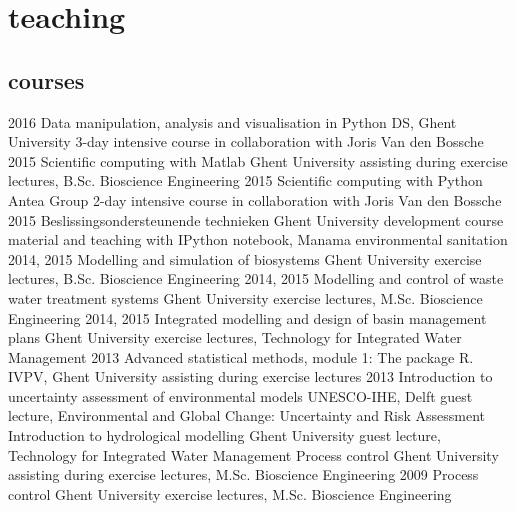 \documentclass[]{stvhoey-cv}  %
\begin{document}
\section{teaching}
\subsection*{courses}
\begin{entrylist}
  \entry
    {2016}
    {Data manipulation, analysis and visualisation in Python}
    {DS, Ghent University}
    {3-day intensive course in collaboration with Joris Van den Bossche}
  \entry
    {2015}
    {Scientific computing with Matlab}
    {Ghent University}
    {assisting during exercise lectures, B.Sc. Bioscience Engineering}
  \entry
    {2015}
    {Scientific computing with Python}
    {Antea Group}
    {2-day intensive course in collaboration with Joris Van den Bossche}
  \entry
    {2015}
    {Beslissingsondersteunende technieken}
    {Ghent University}
    {development course material and teaching with IPython notebook, Manama environmental sanitation}
  \entry
    {2014, 2015}
    {Modelling and simulation of biosystems}
    {Ghent University}
    {exercise lectures, B.Sc. Bioscience Engineering}
   \entry
    {2014, 2015} %
    {Modelling and control of waste water treatment systems}
    {Ghent University}
    {exercise lectures, M.Sc. Bioscience Engineering}
   \entry
    {2014, 2015}%
    {Integrated modelling and design of basin management plans}
    {Ghent University}
    {exercise lectures, Technology for Integrated Water Management}
   \entry
    {2013}
    {Advanced statistical methods, module 1: The package R.}
    {IVPV, Ghent University}
    {assisting during exercise lectures}
   \entry
    {2013}
    {Introduction to uncertainty assessment of environmental models}
    {UNESCO-IHE, Delft}
    {guest lecture, Environmental and Global Change: Uncertainty and Risk Assessment}
   \entry
    {}
    {Introduction to hydrological modelling}
    {Ghent University}
    {guest lecture, Technology for Integrated Water Management}
   \entry
	{} %
    {Process control}
    {Ghent University}
    {assisting during exercise lectures, M.Sc. Bioscience Engineering}
   \entry
    {2009}
    {Process control}
    {Ghent University}
    {exercise lectures, M.Sc. Bioscience Engineering}
\end{entrylist}
\end{document}

